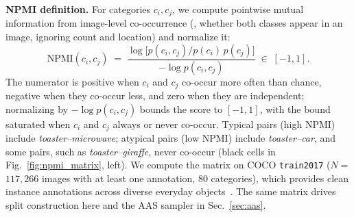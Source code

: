 \noindent\textbf{NPMI definition.}
For categories $c_i, c_j$, we compute pointwise mutual information from image-level co-occurrence (\ie, whether both classes appear in an image, ignoring count and location) and normalize it:
\begin{equation}
\text{NPMI}(c_i, c_j) \;=\; \frac{\log \big[ p(c_i, c_j) / p(c_i)\,p(c_j) \big]}{- \log p(c_i, c_j)} \;\in\; [-1, 1].
\end{equation}
The numerator is positive when $c_i$ and $c_j$ co-occur more often than chance, negative when they co-occur less, and zero when they are independent; normalizing by $-\log p(c_i, c_j)$ bounds the score to $[-1, 1]$, with the bound saturated when $c_i$ and $c_j$ always or never co-occur. Typical pairs (high NPMI) include \emph{toaster--microwave}; atypical pairs (low NPMI) include \emph{toaster--car}, and some pairs, such as \emph{toaster--giraffe}, never co-occur (black cells in Fig.~\ref{fig:npmi_matrix}, left). We compute the matrix on COCO \texttt{train2017} ($N = {}$$117{,}266$ images with at least one annotation, $80$ categories), which provides clean instance annotations across diverse everyday objects~\cite{mscoco14}. The same matrix drives split construction here and the AAS sampler in Sec.~\ref{sec:aas}.



